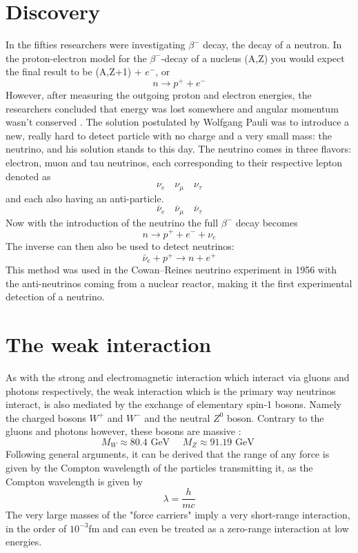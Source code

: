 \section{Discovery}
In the fifties researchers were investigating $\beta^-$ decay, the decay of a neutron. 
In the proton-electron model for the $\beta^-$-decay of a nucleus (A,Z) you would
expect the final result to be (A,Z+1) + $e^-$, or
\begin{equation}
	n \rightarrow p^+ + e^-
\end{equation}
However, after measuring the outgoing proton and electron energies, the researchers
concluded that energy was lost somewhere and angular momentum wasn't conserved
\cite{Bilenky_2012}. The solution postulated by Wolfgang Pauli was to introduce
a new, really hard to detect particle with no charge and a very small mass: the
neutrino, and his solution stands to this day.  The neutrino comes in three
flavors: electron, muon and tau neutrinos, each corresponding to their
respective lepton denoted as
\begin{equation}
	\nu_e \quad \nu_\mu \quad \nu_\tau
\end{equation}
and each also having an anti-particle.
\begin{equation}
	\bar{\nu}_e \quad \bar{\nu}_\mu \quad \bar{\nu}_\tau
\end{equation}
Now with the introduction of the neutrino the full $\beta^-$ decay
becomes
\begin{equation}
	n \rightarrow p^+ + e^- + \nu_e
\end{equation}
The inverse can then also be used to detect neutrinos:
\begin{equation}
	\bar{\nu}_e + p^+ \rightarrow n + e^+
\end{equation}
This method was used in the Cowan–Reines neutrino experiment in 1956 with the
anti-neutrinos coming from a nuclear reactor\cite{BetaCapture}, making it the
first experimental detection of a neutrino.
\section{The weak interaction}
\label{sec:WeakInt}
As with the strong and electromagnetic interaction which interact via gluons
and photons respectively, the weak interaction which is the primary way
neutrinos interact, is also mediated by the exchange of elementary spin-1
bosons.  Namely the charged bosons $W^+$ and $W^-$ and the neutral $Z^0$ boson\cite{mandl2010quantum}.
Contrary to the gluons and photons however, these bosons are massive \cite{Workman:2022ynf}:
\begin{equation}
  M_W \approx 80.4\text{ GeV }\quad M_Z \approx 91.19\text{ GeV }
\end{equation}
Following general arguments, it can be derived that the
range of any force is given by the Compton wavelength of the particles transmitting it\cite{martin2017particle},
as the Compton wavelength is given by 
\begin{equation}
  \lambda = \frac{h}{mc}
\end{equation}
The very large masses of the "force carriers" imply a very short-range
interaction, in the order of $10^{-3}$fm and can even be treated as a
zero-range interaction at low energies.

